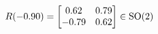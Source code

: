 \documentclass[preview]{standalone}
\begin{document}
\begin{align*}
\special{dvisvgm:raw <g id='unique000'>}R(-0.90) = \begin{bmatrix} 0.62 & 0.79 \\ -0.79 & 0.62 \end{bmatrix} \in \text{SO}(2)\special{dvisvgm:raw </g>}
\end{align*}
\end{document}
